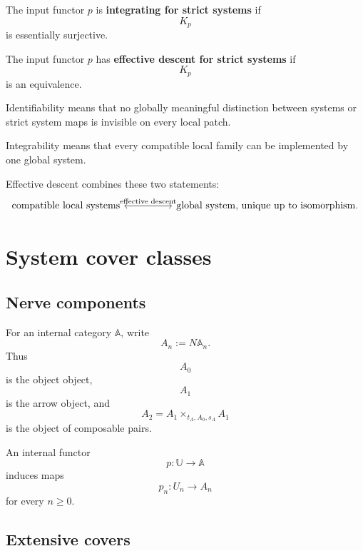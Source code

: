 \begin{definition}
\label{def:interface-integrability-rigorous}
The input functor \(p\) is \textbf{integrating for strict systems} if
\[
    K_p
\]
is essentially surjective.
\end{definition}

\begin{definition}
\label{def:effective-system-descent}
The input functor \(p\) has \textbf{effective descent for strict systems} if
\[
    K_p
\]
is an equivalence.
\end{definition}

Identifiability means that no globally meaningful distinction between systems
or strict system maps is invisible on every local patch.

Integrability means that every compatible local family can be implemented by
one global system.

Effective descent combines these two statements:
\[
\begin{tikzcd}[column sep=huge]
    \text{compatible local systems}
        \arrow[r, leftrightarrow, "\text{effective descent}"]
    &
    \text{global system, unique up to isomorphism}.
\end{tikzcd}
\]

\section{System cover classes}
\label{sec:system-cover-classes}

\subsection{Nerve components}
\label{subsec:nerve-components-input-cover}

For an internal category \(\mathbb A\), write
\[
    A_n:=N\mathbb A_n.
\]
Thus
\[
    A_0
\]
is the object object,
\[
    A_1
\]
is the arrow object, and
\[
    A_2
    =
    A_1\times_{t_A,A_0,s_A}A_1
\]
is the object of composable pairs.

An internal functor
\[
    p:\mathbb U\to\mathbb A
\]
induces maps
\[
    p_n:
    U_n\to A_n
\]
for every \(n\geq0\).

\subsection{Extensive covers}
\label{subsec:extensive-interface-covers}

